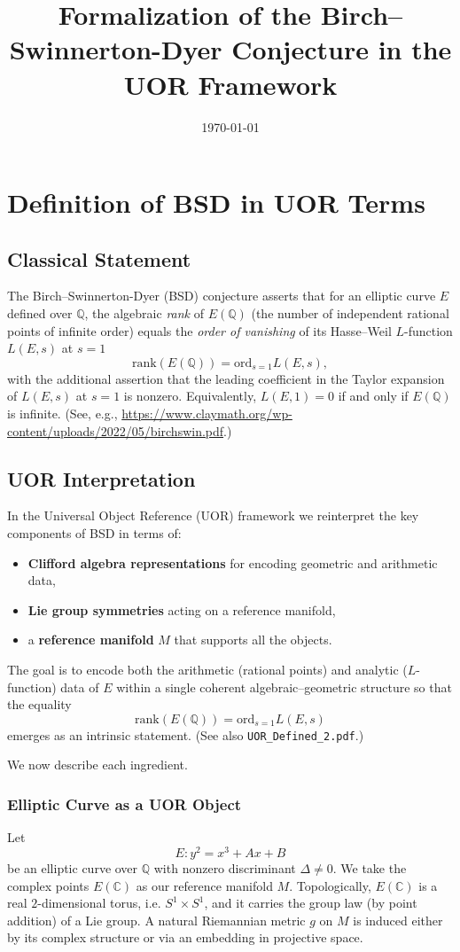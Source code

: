 \documentclass[11pt]{article}
\title{Formalization of the Birch--Swinnerton-Dyer Conjecture in the UOR Framework}
\author{ }
\date{\today}
\begin{document}
\maketitle

\section{Definition of BSD in UOR Terms}

\subsection*{Classical Statement}
The Birch--Swinnerton-Dyer (BSD) conjecture asserts that for an elliptic curve $E$ defined over $\mathbb{Q}$, the algebraic \emph{rank} of $E(\mathbb{Q})$ (the number of independent rational points of infinite order) equals the \emph{order of vanishing} of its Hasse--Weil $L$-function $L(E,s)$ at $s=1$ 
\[
\mathrm{rank}(E(\mathbb{Q})) = \mathrm{ord}_{s=1} L(E,s),
\]
with the additional assertion that the leading coefficient in the Taylor expansion of $L(E,s)$ at $s=1$ is nonzero. Equivalently, $L(E,1)=0$ if and only if $E(\mathbb{Q})$ is infinite. (See, e.g., \url{https://www.claymath.org/wp-content/uploads/2022/05/birchswin.pdf}.)

\subsection*{UOR Interpretation}
In the Universal Object Reference (UOR) framework we reinterpret the key components of BSD in terms of:
\begin{itemize}[leftmargin=2em]
  \item \textbf{Clifford algebra representations} for encoding geometric and arithmetic data,
  \item \textbf{Lie group symmetries} acting on a reference manifold,
  \item a \textbf{reference manifold} $M$ that supports all the objects.
\end{itemize}
The goal is to encode both the arithmetic (rational points) and analytic ($L$-function) data of $E$ within a single coherent algebraic--geometric structure so that the equality 
\[
\mathrm{rank}(E(\mathbb{Q})) = \mathrm{ord}_{s=1} L(E,s)
\]
emerges as an intrinsic statement. (See also \texttt{UOR\_Defined\_2.pdf}.)

\medskip

We now describe each ingredient.

\subsubsection*{Elliptic Curve as a UOR Object}
Let 
\[
E: y^2 = x^3 + Ax + B
\]
be an elliptic curve over $\mathbb{Q}$ with nonzero discriminant $\Delta\neq 0$. We take the complex points $E(\mathbb{C})$ as our reference manifold $M$. Topologically, $E(\mathbb{C})$ is a real $2$-dimensional torus, i.e. $S^1 \times S^1$, and it carries the group law (by point addition) of a Lie group. A natural Riemannian metric $g$ on $M$ is induced either by its complex structure or via an embedding in projective space. 
\end{document}

